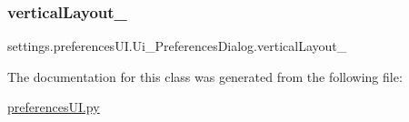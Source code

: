 \subsubsection{\texorpdfstring{vertical\+Layout\+\_}{verticalLayout\_5}}
{\footnotesize\ttfamily settings.\+preferences\+U\+I.\+Ui\+\_\+\+Preferences\+Dialog.\+vertical\+Layout\+\_}



The documentation for this class was generated from the following file\+:\begin{DoxyCompactItemize}
\item 
\hyperlink{preferences_u_i_8py}{preferences\+U\+I.\+py}\end{DoxyCompactItemize}
